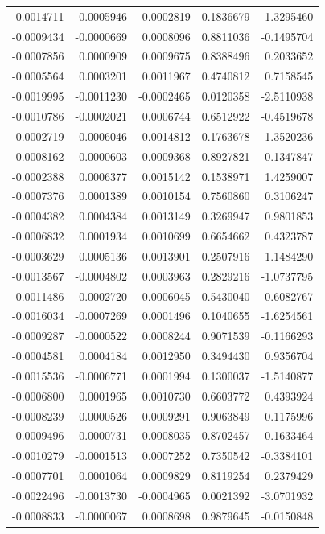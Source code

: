 \documentclass[]{tufte-handout}
\begin{document}
\begin{longtable}[]{@{}rrrrr@{}}
-0.0014711 & -0.0005946 & 0.0002819 & 0.1836679 & -1.3295460 \\
-0.0009434 & -0.0000669 & 0.0008096 & 0.8811036 & -0.1495704 \\
-0.0007856 & 0.0000909 & 0.0009675 & 0.8388496 & 0.2033652 \\
-0.0005564 & 0.0003201 & 0.0011967 & 0.4740812 & 0.7158545 \\
-0.0019995 & -0.0011230 & -0.0002465 & 0.0120358 & -2.5110938 \\
-0.0010786 & -0.0002021 & 0.0006744 & 0.6512922 & -0.4519678 \\
-0.0002719 & 0.0006046 & 0.0014812 & 0.1763678 & 1.3520236 \\
-0.0008162 & 0.0000603 & 0.0009368 & 0.8927821 & 0.1347847 \\
-0.0002388 & 0.0006377 & 0.0015142 & 0.1538971 & 1.4259007 \\
-0.0007376 & 0.0001389 & 0.0010154 & 0.7560860 & 0.3106247 \\
-0.0004382 & 0.0004384 & 0.0013149 & 0.3269947 & 0.9801853 \\
-0.0006832 & 0.0001934 & 0.0010699 & 0.6654662 & 0.4323787 \\
-0.0003629 & 0.0005136 & 0.0013901 & 0.2507916 & 1.1484290 \\
-0.0013567 & -0.0004802 & 0.0003963 & 0.2829216 & -1.0737795 \\
-0.0011486 & -0.0002720 & 0.0006045 & 0.5430040 & -0.6082767 \\
-0.0016034 & -0.0007269 & 0.0001496 & 0.1040655 & -1.6254561 \\
-0.0009287 & -0.0000522 & 0.0008244 & 0.9071539 & -0.1166293 \\
-0.0004581 & 0.0004184 & 0.0012950 & 0.3494430 & 0.9356704 \\
-0.0015536 & -0.0006771 & 0.0001994 & 0.1300037 & -1.5140877 \\
-0.0006800 & 0.0001965 & 0.0010730 & 0.6603772 & 0.4393924 \\
-0.0008239 & 0.0000526 & 0.0009291 & 0.9063849 & 0.1175996 \\
-0.0009496 & -0.0000731 & 0.0008035 & 0.8702457 & -0.1633464 \\
-0.0010279 & -0.0001513 & 0.0007252 & 0.7350542 & -0.3384101 \\
-0.0007701 & 0.0001064 & 0.0009829 & 0.8119254 & 0.2379429 \\
-0.0022496 & -0.0013730 & -0.0004965 & 0.0021392 & -3.0701932 \\
-0.0008833 & -0.0000067 & 0.0008698 & 0.9879645 & -0.0150848 \\

\end{longtable}
\end{document}
